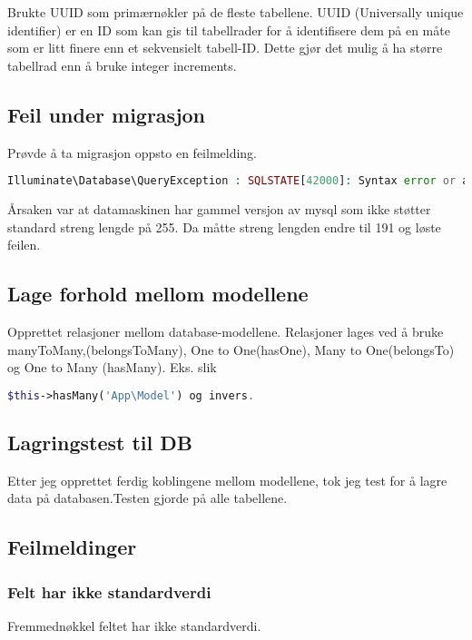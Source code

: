 Brukte UUID som primærnøkler på de fleste tabellene. UUID (Universally unique identifier)\cite{kilroy2017agulm} er en ID som kan gis til tabellrader for å identifisere dem på en måte som er litt finere enn et sekvensielt tabell-ID. Dette gjør det mulig å ha større tabellrad enn å bruke integer increments.

\subsection{Feil under migrasjon}
Prøvde å ta migrasjon oppsto en feilmelding.
\begin{lstlisting}[language=PHP]
Illuminate\Database\QueryException : SQLSTATE[42000]: Syntax error or access violation: 1071 Specified key was too long; max key length is 767 bytes (SQL: alter table `users` add unique `users_email_unique`(`email`))
\end{lstlisting}
Årsaken var at datamaskinen har gammel versjon av mysql som ikke støtter standard streng lengde på 255. Da måtte streng lengden endre til 191 og løste feilen.

\subsection{Lage forhold mellom modellene}
Opprettet relasjoner mellom database-modellene. 
Relasjoner  lages ved å bruke  manyToMany,(belongsToMany), One to One(hasOne), Many to One(belongsTo) og  One to Many (hasMany). Eks.  slik  

\begin{lstlisting}[language=PHP]
    $this->hasMany('App\Model') og invers.
\end{lstlisting}

\subsection{Lagringstest til DB}
Etter jeg opprettet ferdig koblingene mellom modellene, tok jeg test for å lagre data på databasen.Testen gjorde på alle tabellene.

\subsection{Feilmeldinger}
\subsubsection{Felt har ikke  standardverdi}
Fremmednøkkel feltet har ikke  standardverdi.

